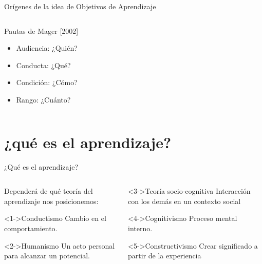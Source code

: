 \documentclass[11pt, aspectratio=169, xcolor=table,hyphens]{beamer}
\begin{document}
\begin{frame}{Orígenes de la idea de Objetivos de Aprendizaje}
\begin{columns}
\begin{column}{.5\linewidth}
{\begin{block}{Pautas de Mager [2002]\nocite{EDUTEKA2002}}
					\begin{itemize}
						\item Audiencia: ¿Quién?
						\item Conducta: ¿Qué?
						\item Condición: ¿Cómo?
						\item Rango: ¿Cuánto?
					\end{itemize}
				\end{block}
			}
		\end{column}
	\end{columns}
\end{frame}

\section{¿qué es el aprendizaje?}

\begin{frame}{¿Qué es el aprendizaje? \cite{SMITH2021}}
	\begin{columns}
		\begin{column}{.5\linewidth}
			Dependerá de qué teoría del aprendizaje nos posicionemos:
			\begin{block}<1->{Conductismo \only<6->{[Observable]}}
				Cambio en el comportamiento.
			\end{block}
			\begin{block}<2->{Humanismo \only<6->{[No observable]}}
				Un acto personal para alcanzar un potencial.
			\end{block}
		\end{column}
		\begin{column}{.5\linewidth}
			\begin{block}<3->{Teoría socio-cognitiva \only<6->{[No observable]}}
				Interacción con los demás en un contexto social
			\end{block}
			\begin{block}<4->{Cognitivismo \only<6->{[No observable]}}
				Proceso mental interno.
			\end{block}
			\begin{block}<5->{Constructivismo \only<6->{[No observable]}}
				Crear significado a partir de la experiencia
			\end{block}
		\end{column}
	\end{columns}
\end{frame}
\end{document}
